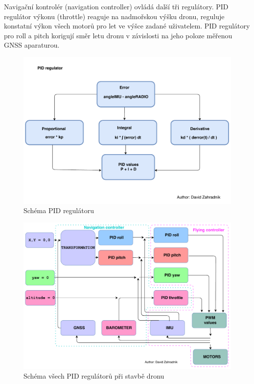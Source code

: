 Navigační kontrolér (navigation controller) ovládá další tři regulátory. PID regulátor výkonu (throttle) reaguje na nadmořskou výšku dronu, reguluje konstatní výkon všech motorů pro let ve výšce zadané uživatelem. PID regulátory pro roll a pitch korigují směr letu dronu v závislosti na jeho poloze měřenou GNSS aparaturou.\cite{pid} \cite{hacksterpid}\\
\begin{figure}[H]
	\centering
	\includegraphics[width=15cm]{pictures/PIDDiagram.pdf}
	\caption{Schéma PID regulátoru}
\end{figure}
\begin{figure}[H]
	\centering
	\includegraphics[width=15cm]{pictures/PIDsDiagram.pdf}
	\caption{Schéma všech PID regulátorů při stavbě dronu}
\end{figure}

